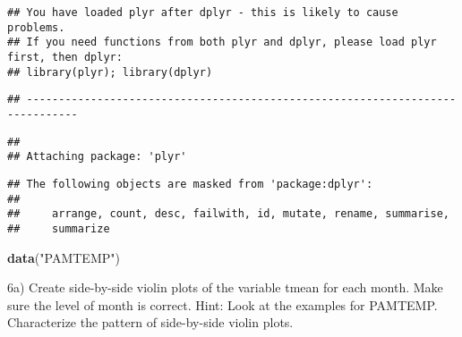 \documentclass[
]{article}
\newenvironment{Shaded}{\begin{snugshade}}{\end{snugshade}}
\newcommand{\AttributeTok}[1]{\textcolor[rgb]{0.13,0.29,0.53}{#1}}
\newcommand{\CommentTok}[1]{\textcolor[rgb]{0.56,0.35,0.01}{\textit{#1}}}
\newcommand{\ConstantTok}[1]{\textcolor[rgb]{0.56,0.35,0.01}{#1}}
\newcommand{\DecValTok}[1]{\textcolor[rgb]{0.00,0.00,0.81}{#1}}
\newcommand{\FunctionTok}[1]{\textcolor[rgb]{0.13,0.29,0.53}{\textbf{#1}}}
\newcommand{\NormalTok}[1]{#1}
\newcommand{\OtherTok}[1]{\textcolor[rgb]{0.56,0.35,0.01}{#1}}
\newcommand{\SpecialCharTok}[1]{\textcolor[rgb]{0.81,0.36,0.00}{\textbf{#1}}}
\newcommand{\StringTok}[1]{\textcolor[rgb]{0.31,0.60,0.02}{#1}}
\begin{document}
\begin{verbatim}
## You have loaded plyr after dplyr - this is likely to cause problems.
## If you need functions from both plyr and dplyr, please load plyr first, then dplyr:
## library(plyr); library(dplyr)
\end{verbatim}

\begin{verbatim}
## ------------------------------------------------------------------------------
\end{verbatim}

\begin{verbatim}
## 
## Attaching package: 'plyr'
\end{verbatim}

\begin{verbatim}
## The following objects are masked from 'package:dplyr':
## 
##     arrange, count, desc, failwith, id, mutate, rename, summarise,
##     summarize
\end{verbatim}

\begin{Shaded}
\begin{Highlighting}[]
\FunctionTok{data}\NormalTok{(}\StringTok{"PAMTEMP"}\NormalTok{)}
\end{Highlighting}
\end{Shaded}

6a) Create side-by-side violin plots of the variable tmean for each
month. Make sure the level of month is correct. Hint: Look at the
examples for PAMTEMP. Characterize the pattern of side-by-side violin
plots.

\begin{Shaded}
\end{Shaded}
\end{document}
